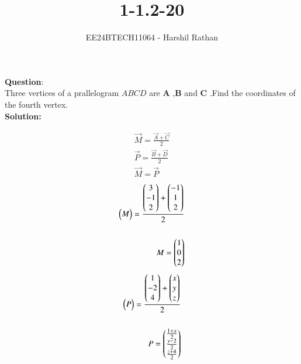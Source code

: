 \documentclass[journal]{IEEEtran}
\begin{document}

\vspace{3cm}

\title{1-1.2-20}
\author{EE24BTECH11064 - Harshil Rathan 
}
{\let\newpage\relax\maketitle}

\renewcommand{\thefigure}{\theenumi}
\renewcommand{\thetable}{\theenumi}
\setlength{\intextsep}{10pt} %


\renewcommand{\thetable}{\theenumi}
\textbf{Question}:\\
Three vertices of a prallelogram $ABCD$ are \textbf{A} ,\textbf{B}  and \textbf{C} .Find the coordinates of the fourth vertex.
\\
\textbf{Solution: }
\begin{table}[h!]    
  \centering
  
\end{table}
\begin{align}
    \vec{M} = \frac{\vec{A}+\vec{C}}{2}\\
    \vec{P} = \frac{\vec{B}+\vec{D}}{2}\\
    \vec{M} = \vec{P}
\end{align}    
\begin{align}    
\begin{pmatrix}M\end{pmatrix}=\frac{\begin{pmatrix}3\\-1\\2\end{pmatrix}+\begin{pmatrix}-1\\1\\2\end{pmatrix}}{2}\\\\
M =\begin{pmatrix}1\\0\\2\end{pmatrix}\\
\end{align}
\begin{align}
\begin{pmatrix}P\end{pmatrix}=\frac{\begin{pmatrix}1\\-2\\4\end{pmatrix}+\begin{pmatrix}x\\y\\z\end{pmatrix}}{2}\\\\
P= \begin{pmatrix}\frac{1+x}{2}\\ \frac{y-2}{2} \\ \frac{z+4}{2}\end{pmatrix}\\
\end{align}
\end{document}
